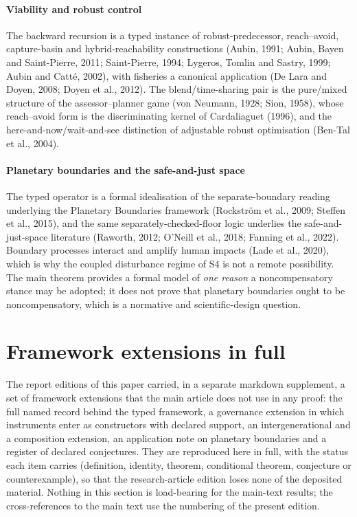 \documentclass[preprint,11pt,authoryear]{elsarticle}
\theoremstyle{remark}
\begin{document}
\paragraph{Viability and robust control} The backward recursion is a typed instance of robust-predecessor, reach--avoid, capture-basin and hybrid-reachability constructions (Aubin, 1991; Aubin, Bayen and Saint-Pierre, 2011; Saint-Pierre, 1994; Lygeros, Tomlin and Sastry, 1999; Aubin and Catt\'e, 2002), with fisheries a canonical application (De Lara and Doyen, 2008; Doyen et al., 2012). The blend/time-sharing pair is the pure/mixed structure of the assessor--planner game (von Neumann, 1928; Sion, 1958), whose reach--avoid form is the discriminating kernel of Cardaliaguet (1996), and the here-and-now/wait-and-see distinction of adjustable robust optimisation (Ben-Tal et al., 2004).

\paragraph{Planetary boundaries and the safe-and-just space} The typed operator is a formal idealisation of the separate-boundary reading underlying the Planetary Boundaries framework (Rockstr\"om et al., 2009; Steffen et al., 2015), and the same separately-checked-floor logic underlies the safe-and-just-space literature (Raworth, 2012; O'Neill et al., 2018; Fanning et al., 2022). Boundary processes interact and amplify human impacts (Lade et al., 2020), which is why the coupled disturbance regime of S4 is not a remote possibility. The main theorem provides a formal model of \emph{one reason} a noncompensatory stance may be adopted; it does not prove that planetary boundaries ought to be noncompensatory, which is a normative and scientific-design question.

\section{Framework extensions in full}\label{si:framework}

The report editions of this paper carried, in a separate markdown supplement, a set of framework extensions that the main article does not use in any proof: the full named record behind the typed framework, a governance extension in which instruments enter as constructors with declared support, an intergenerational and a composition extension, an application note on planetary boundaries and a register of declared conjectures. They are reproduced here in full, with the status each item carries (definition, identity, theorem, conditional theorem, conjecture or counterexample), so that the research-article edition loses none of the deposited material. Nothing in this section is load-bearing for the main-text results; the cross-references to the main text use the numbering of the present edition.
\end{document}
